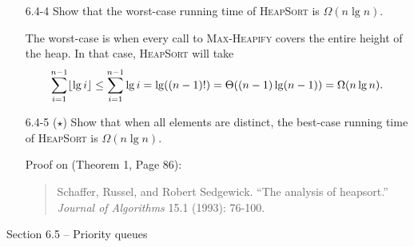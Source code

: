 \begin{enumerate}
\item[6.4-4]{Show that the worst-case running time of \textsc{HeapSort} is
$\Omega(n \lg n)$.}

\begin{framed}
The worst-case is when every call to \textsc{Max-Heapify} covers the entire
height of the heap. In that case, \textsc{HeapSort} will take
\[
  \sum_{i = 1}^{n - 1} \lfloor\lg i\rfloor \le \sum_{i = 1}^{n - 1} \lg i = \lg((n - 1)!) = \Theta((n - 1) \lg (n - 1)) = \Omega(n \lg n).
\]
\end{framed}

\item[6.4-5]{($\star$) Show that when all elements are distinct, the best-case
running time of \textsc{HeapSort} is $\Omega(n \lg n)$.}

\begin{framed}
Proof on (Theorem 1, Page 86):
\begin{quote}
Schaffer, Russel, and Robert Sedgewick. ``The analysis of heapsort.''
\emph{Journal of Algorithms} 15.1 (1993): 76-100.
\end{quote}
\end{framed}

\end{enumerate}

\newpage

{\large Section 6.5 {--} Priority queues}

